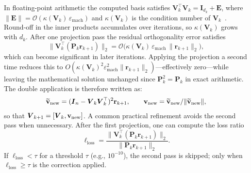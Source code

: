 \documentclass[%
  a4paper,
  onecolumn,
  colorlinks,
]{preprint}
\theoremstyle{plain}
\theoremstyle{definition}
\newcommand{\bE}{\ensuremath{\boldsymbol{E}}}
\newcommand{\bI}{\ensuremath{\boldsymbol{I}}}
\newcommand{\bP}{\ensuremath{\boldsymbol{P}}}
\newcommand{\bV}{\ensuremath{\boldsymbol{V}}}
\newcommand{\br}{\mathbf{r}}
\newcommand{\bv}{\mathbf{v}}
\newcommand{\vnew}{\bv_{\mathrm{new}}}
\begin{document}
In floating-point arithmetic the computed basis satisfies
$\bV_k^\top\bV_k = \bI_{d_k} + \bE$, where
$\|\bE\| = \mathcal{O}(\kappa(\bV_k)\,\varepsilon_\mathrm{mach})$
and $\kappa(\bV_k)$ is the condition number of $\bV_k$~\cite{GiraudLangouRozloznik05}.
Round-off in the inner products accumulates over iterations, so
$\kappa(\bV_k)$ grows with $d_k$.
After one projection pass the residual orthogonality error satisfies
\begin{equation}\label{eq:single_residual}
  \bigl\|\bV_k^\top(\bP_k\br_{k+1})\bigr\|_2
  = \mathcal{O}\!\bigl(\kappa(\bV_k)\,\varepsilon_\mathrm{mach}\,\|\br_{k+1}\|_2\bigr),
\end{equation}
which can become significant in later iterations.
Applying the projection a second time reduces this to
$O(\kappa(\bV_k)^2\varepsilon_\mathrm{mach}^2\|\br_{k+1}\|_2)$---effectively
zero---while leaving the mathematical solution unchanged since $\bP_k^2 = \bP_k$
in exact arithmetic. The double application is therefore written as:
\[
   \mathbf{\widetilde v}_{\rm new} = (\bI_n - \bV_k\bV_k^\top)^2\br_{k+1},\qquad \vnew=\mathbf{\widetilde v}_{\rm new}/\|\mathbf{\widetilde v}_{\rm new}\|,
\]
so that $\bV_{k+1}=[\bV_k,\mathbf{v}_{\rm new}]$.
A common practical refinement avoids the second pass when unnecessary.
After the first projection, one can compute the loss ratio
\begin{equation}\label{eq:loss_criterion}
  \ell_{\mathrm{loss}} = \frac{\|\bV_k^\top(\bP_k\br_{k+1})\|_2}{\|\bP_k\br_{k+1}\|_2}.
\end{equation}
If $\ell_{\mathrm{loss}} < \tau$ for a threshold $\tau$ (e.g., $10^{-10}$),
the second pass is skipped; only when $\ell_{\mathrm{loss}} \geq \tau$ is the
correction applied.

\end{document}
